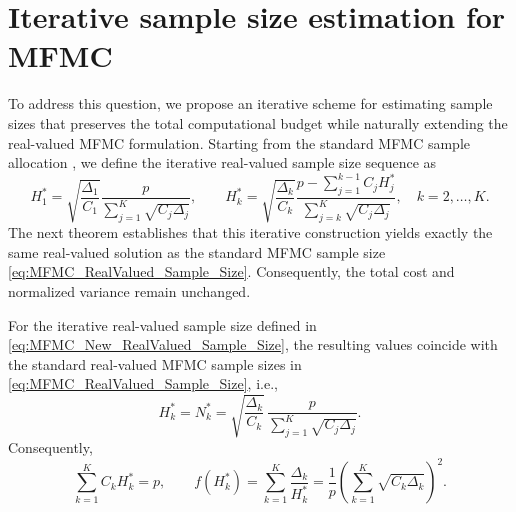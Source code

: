 \section{Iterative sample size estimation for MFMC}\label{sec:Iterative_IntegerValued_Sample_Size}
To address this question, we propose an iterative scheme for estimating sample sizes that preserves the total computational budget while naturally extending the real-valued MFMC formulation.  
Starting from the standard MFMC sample allocation \cite{PeGuWi:2018}, we define the iterative real-valued sample size sequence as
%
\begin{equation}
    \label{eq:MFMC_New_RealValued_Sample_Size}
    H_1^* = \sqrt{\frac{\Delta_1}{C_1}}\frac{p}{\sum_{j=1}^K\sqrt{C_j\Delta_j}}, 
    \qquad 
    H_k^* = \sqrt{\frac{\Delta_k}{C_k}}\frac{p-\sum_{j=1}^{k-1}C_jH_j^*}{\sum_{j=k}^K\sqrt{C_j\Delta_j}}, 
    \quad k = 2,\ldots, K.
\end{equation}
%
The next theorem establishes that this iterative construction yields exactly the same real-valued solution as the standard MFMC sample size \eqref{eq:MFMC_RealValued_Sample_Size}.  
Consequently, the total cost and normalized variance remain unchanged.


\begin{theorem}\label{thm:MFMC_Iteravie_RealValued_Sample_Size}

For the iterative real-valued sample size defined in \eqref{eq:MFMC_New_RealValued_Sample_Size}, 
the resulting values coincide with the standard real-valued MFMC sample sizes in 
\eqref{eq:MFMC_RealValued_Sample_Size}, i.e.,
%
\[
H_k^* = N_k^*
    = \sqrt{\frac{\Delta_k}{C_k}}\,
      \frac{p}{\sum_{j=1}^K \sqrt{C_j\Delta_j}}.
\]
%
Consequently,
%
\[
\sum_{k=1}^K C_k H_k^* = p, 
\qquad  
f(H_k^*) = \sum_{k=1}^K \frac{\Delta_k}{H_k^*} 
= \frac{1}{p} \left(\sum_{k=1}^K \sqrt{C_k\Delta_k}\right)^2.
\]
%
\end{theorem}




